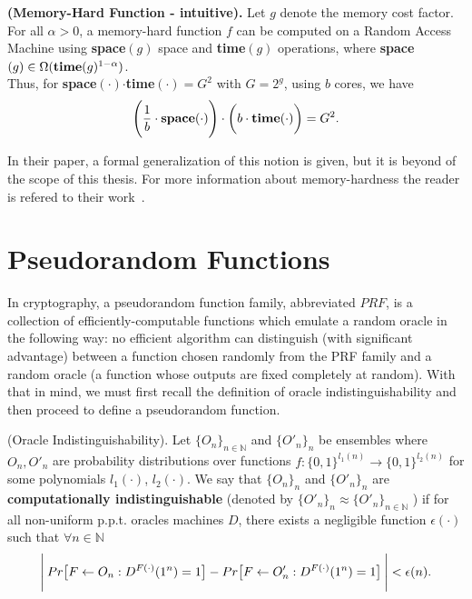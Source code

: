 \begin{definition}{\textbf{(Memory-Hard Function - intuitive).}}\textnormal{\cite{ForlerLW13}}
  Let $g$ denote the memory cost factor. For all $\alpha > 0$, a memory-hard function $f$ can be computed on a Random Access Machine using \textbf{space}$(g)$ space and \textbf{time}$(g)$ operations, where \textbf{space}$(g) \in \Omega(\mbox{\textbf{time}}(g)^{1-\alpha})$.\\

  \noindent Thus, for \textbf{space}$(\cdot)$\:$\cdot$\:\textbf{time}$(\cdot)$\:$=G^2$ with $G=2^g$, using $b$ cores, we have
  \begin{equation}\label{eqn:memhard}
    \Bigg{(} \frac{1}{b} \cdot \mbox{\textbf{space}}(\cdot) \Bigg{)} \cdot \bigg{(} b \cdot \mbox{\textbf{time}}(\cdot) \bigg{)} = G^2.
  \end{equation}
\end{definition}
In their paper, a formal generalization of this notion is given, but it is beyond of the scope of this thesis. For more information about memory-hardness the reader is refered to their work~\cite{ForlerLW13}.
%
\section{Pseudorandom Functions} \label{PRF}
In cryptography, a pseudorandom function family, abbreviated $PRF$, is a collection of efficiently-computable functions which emulate a random oracle in the following way: no efficient algorithm can distinguish (with significant advantage) between a function chosen randomly from the PRF family and a random oracle (a function whose outputs are fixed completely at random). With that in mind,
we must first recall the definition of oracle indistinguishability and then proceed to define a pseudorandom function.

\begin{definition}{(Oracle Indistinguishability).} \textnormal{\cite{ACI}}
  Let $\{ O_n \}_{n \in \mathbb{N}}$ and $\{ O'_{n} \}_{n}$ be ensembles where $O_n, O'_n$ are probability
  distributions over functions $f: \{ 0,1 \}^{l_1(n)} \rightarrow \{ 0,1 \}^{l_2(n)}$ for some polynomials $l_1(\cdot)$, $l_2(\cdot)$. We say that $\{ O_{n} \}_{n}$ and $\{ O'_{n} \}_{n}$ are \textbf{computationally indistinguishable} (denoted by $\{ O'_{n} \}_{n} \approx \{ O'_n \}_{n \in \mathbb{N}}$
  ) if for all non-uniform p.p.t. oracles machines $D$, there exists a negligible function $\epsilon(\cdot)$ such that $\forall n \in \mathbb{N}$
  \begin{equation}{\label{oracle}}
    \Bigg{\lvert} \: Pr \big{[} F \leftarrow O_n : D^{F(\cdot)}(1^n)=1 \big{]} - Pr \big{[} F \leftarrow O'_n : D^{F(\cdot)}(1^n)=1 \big{]} \: \Bigg{\rvert} < \epsilon(n).
  \end{equation}
\end{definition}

